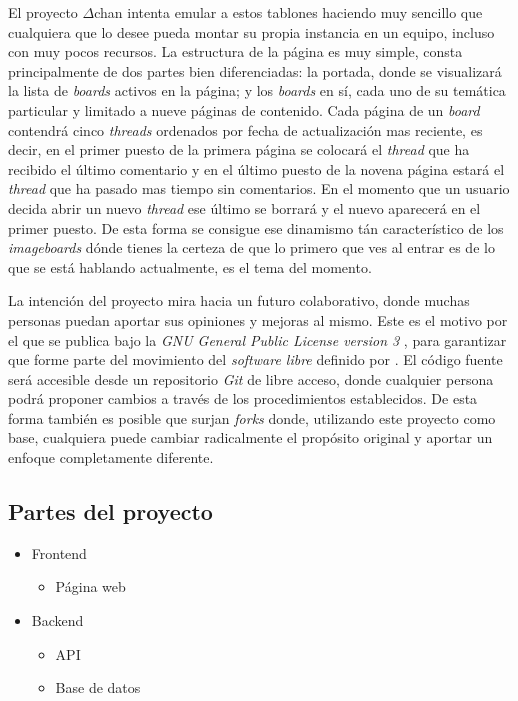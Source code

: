 \documentclass[12pt,a4paper,titlepage]{article}
\newcommand\projectname{$\Delta$chan}
\begin{document}
    El proyecto {\projectname} intenta emular a estos tablones haciendo muy sencillo que cualquiera que lo desee pueda montar su propia instancia en un equipo, incluso con muy pocos recursos. La estructura de la página es muy simple, consta principalmente de dos partes bien diferenciadas: la portada, donde se visualizará la lista de \textit{boards} activos en la página; y los \textit{boards} en sí, cada uno de su temática particular y limitado a nueve páginas de contenido. Cada página de un \textit{board} contendrá cinco \textit{threads} ordenados por fecha de actualización mas reciente, es decir, en el primer puesto de la primera página se colocará el \textit{thread} que ha recibido el último comentario y en el último puesto de la novena página estará el \textit{thread} que ha pasado mas tiempo sin comentarios. En el momento que un usuario decida abrir un nuevo \textit{thread} ese último se borrará y el nuevo aparecerá en el primer puesto. De esta forma se consigue ese dinamismo tán característico de los \textit{imageboards} dónde tienes la certeza de que lo primero que ves al entrar es de lo que se está hablando actualmente, es el tema del momento.

    La intención del proyecto mira hacia un futuro colaborativo, donde muchas personas puedan aportar sus opiniones y mejoras al mismo. Este es el motivo por el que se publica bajo la \emph{GNU General Public License version 3} \cite{gnugplv3}, para garantizar que forme parte del movimiento del \emph{software libre} definido por \textcite{libresoftwaredefinition}. El código fuente será accesible desde un repositorio \emph{Git} de libre acceso, donde cualquier persona podrá proponer cambios a través de los procedimientos establecidos. De esta forma también es posible que surjan \textit{forks} \cite{wiki:fork} donde, utilizando este proyecto como base, cualquiera puede cambiar radicalmente el propósito original y aportar un enfoque completamente diferente.

    \subsection{Partes del proyecto}

    \begin{itemize}
        \item Frontend
        \begin{itemize}
            \item Página web
        \end{itemize}
        \item Backend
        \begin{itemize}
            \item API
            \item Base de datos
        \end{itemize}
    \end{itemize}
\end{document}
